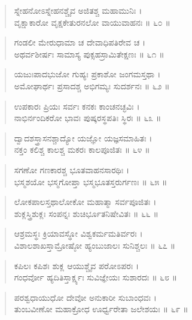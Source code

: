 \begin{verse}
ಸ್ನೇಹನೋಽಸ್ನೇಹನಶ್ಚೈವ ಅಜಿತಶ್ಚ ಮಹಾಮುನಿಃ ।\\ವೃಕ್ಷಾಕಾರೋ ವೃಕ್ಷಕೇತುರನಲೋ ವಾಯುವಾಹನಃ \num{॥ ೬೦ ॥}
\end{verse}

\begin{verse}
ಗಂಡಲೀ ಮೇರುಧಾಮಾ ಚ ದೇವಾಧಿಪತಿರೇವ ಚ ।\\ಅಥರ್ವಶೀರ್ಷಃ ಸಾಮಾಸ್ಯ ಪುಕ್ಸಹಸ್ರಾಮಿತೇಕ್ಷಣಃ \num{॥ ೬೧ ॥}
\end{verse}

\begin{verse}
ಯಜುಃಪಾದಭುಜೋ ಗುಹ್ಯಃ ಪ್ರಕಾಶೋ ಜಂಗಮಸ್ತಥಾ ।\\ಅಮೋಘಾರ್ಥಃ ಪ್ರಸಾದಶ್ಚ ಅಭಿಗಮ್ಯಃ ಸುದರ್ಶನಃ \num{॥ ೬೨ ॥}
\end{verse}

\begin{verse}
ಉಪಕಾರಃ ಪ್ರಿಯಃ ಸರ್ವಃ ಕನಕಃ ಕಾಂಚನಚ್ಛವಿಃ ।\\ನಾಭಿರ್ನಂದಿಕರೋ ಭಾವಃ ಪುಷ್ಕರಸ್ಥಪತಿಃ ಸ್ಥಿರಃ \num{॥ ೬೩ ॥}
\end{verse}

\begin{verse}
ದ್ವಾದಶಸ್ತ್ರಾಸನಶ್ಚಾದ್ಯೋ ಯಜ್ಞೋ ಯಜ್ಞಸಮಾಹಿತಃ ।\\ನಕ್ತಂ ಕಲಿಶ್ಚ ಕಾಲಶ್ಚ ಮಕರಃ ಕಾಲಪೂಜಿತಃ \num{॥ ೬೪ ॥}
\end{verse}

\begin{verse}
ಸಗಣೋ ಗಣಕಾರಶ್ಚ ಭೂತವಾಹನಸಾರಥಿಃ ।\\ಭಸ್ಮಶಯೋ ಭಸ್ಮಗೋಪ್ತಾ ಭಸ್ಮಭೂತಸ್ತರುರ್ಗಣಃ \num{॥ ೬೫ ॥}
\end{verse}

\begin{verse}
ಲೋಕಪಾಲಸ್ತಥಾಲೋಕೋ ಮಹಾತ್ಮಾ ಸರ್ವಪೂಜಿತಃ ।\\ಶುಕ್ಲಸ್ತ್ರಿಶುಕ್ಲಃ ಸಂಪನ್ನಃ ಶುಚಿರ್ಭೂತನಿಷೇವಿತಃ \num{॥ ೬೬ ॥}
\end{verse}

\begin{verse}
ಆಶ್ರಮಸ್ಥಃ ಕ್ರಿಯಾವಸ್ಥೋ ವಿಶ್ವಕರ್ಮಮತಿರ್ವರಃ ।\\ವಿಶಾಲಶಾಖಸ್ತಾಮ್ರೋಷ್ಠೋ ಹ್ಯಂಬುಜಾಲಃ ಸುನಿಶ್ಚಲಃ \num{॥ ೬೭ ॥}
\end{verse}

\begin{verse}
ಕಪಿಲಃ ಕಪಿಶಃ ಶುಕ್ಲ ಆಯುಶ್ಚೈವ ಪರೋಽಪರಃ ।\\ಗಂಧರ್ವೋ ಹ್ಯದಿತಿಸ್ತಾರ್ಕ್ಷ್ಯಃ ಸುವಿಜ್ಞೇಯಃ ಸುಶಾರದಃ \num{॥ ೬೮ ॥}
\end{verse}

\begin{verse}
ಪರಶ್ವಧಾಯುಧೋ ದೇವೋ ಅನುಕಾರೀ ಸುಬಾಂಧವಃ ।\\ತುಂಬವೀಣೋ ಮಹಾಕ್ರೋಧ ಊರ್ಧ್ವರೇತಾ ಜಲೇಶಯಃ \num{॥ ೬೯ ॥}
\end{verse}

